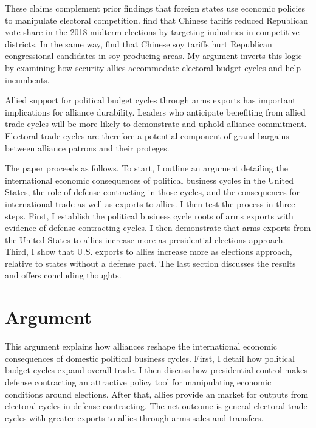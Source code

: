 \documentclass[12pt]{article}
\begin{document}
These claims complement prior findings that foreign states use economic policies to manipulate electoral competition. 
\citet{KimMargalit2021} find that Chinese tariffs reduced Republican vote share in the 2018 midterm elections by targeting industries in competitive districts.
In the same way, \citet{ChyzhUrbatsch2021} find that Chinese soy tariffs hurt Republican congressional candidates in soy-producing areas. 
My argument inverts this logic by examining how security allies accommodate electoral budget cycles and help incumbents. 


Allied support for political budget cycles through arms exports has important implications for alliance durability. 
Leaders who anticipate benefiting from allied trade cycles will be more likely to demonstrate and uphold alliance commitment. 
Electoral trade cycles are therefore a potential component of grand bargains between alliance patrons and their proteges. 


The paper proceeds as follows. 
To start, I outline an argument detailing the international economic consequences of political business cycles in the United States, the role of defense contracting in those cycles, and the consequences for international trade as well as exports to allies.
I then test the process in three steps. 
First, I establish the political business cycle roots of arms exports with evidence of defense contracting cycles. 
I then demonstrate that arms exports from the United States to allies increase more as presidential elections approach.
Third, I show that U.S. exports to allies increase more as elections approach, relative to states without a defense pact. 
The last section discusses the results and offers concluding thoughts.


\section{Argument}


This argument explains how alliances reshape the international economic consequences of domestic political business cycles. 
First, I detail how political budget cycles expand overall trade.
I then discuss how presidential control makes defense contracting an attractive policy tool for manipulating economic conditions around elections. 
After that, allies provide an market for outputs from electoral cycles in defense contracting. 
The net outcome is general electoral trade cycles with greater exports to allies through arms sales and transfers. 
\end{document}
